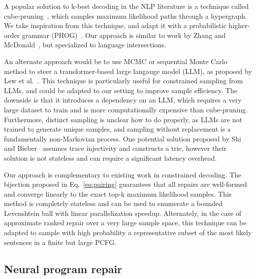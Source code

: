 \documentclass[sigplan,review,acmsmall,nonacm,anonymous]{acmart}\settopmatter{printfolios=false,printccs=false,printacmref=false}
\begin{document}
A popular solution to k-best decoding in the NLP literature is a technique called cube-pruning~\cite{huang2005better, huang2007forest, chiang2007hierarchical}, which samples maximum likelihood paths through a hypergraph. We take inspiration from this technique, and adapt it with a probabilistic higher-order grammar (PHOG)~\cite{bielik2016phog}. Our approach is similar to work by Zhang and McDonald~\cite{zhang2012generalized}, but specialized to language intersections.

  An alternate approach would be to use MCMC or sequential Monte Carlo method to steer a transformer-based large langauge model (LLM), as proposed by Lew et al.~\cite{lew2023sequential}. This technique is particularly useful for constrained sampling from LLMs, and could be adapted to our setting to improve sample efficiency. The downside is that it introduces a dependency on an LLM, which requires a very large dataset to train and is more computationally expensive than cube-pruning. Furthermore, distinct sampling is unclear how to do properly, as LLMs are not trained to generate unique samples, and sampling without replacement is a fundamentally non-Markovian process. One potential solution proposed by Shi and Bieber~\cite{shi2020incremental} assumes trace injectivity and constructs a trie, however their solution is not stateless and can require a significant latency overhead.

  Our approach is complementary to existing work in constrained decoding. The bijection proposed in Eq.~\ref{eq:pairing} guarantees that all repairs are well-formed and converge linearly to the exact top-k maximum likelihood samples. This method is completely stateless and can be used to enumerate a bounded Levenshtein ball with linear parallelization speedup. Alternately, in the case of approximate ranked repair over a very large sample space, this technique can be adapted to sample with high probability a representative subset of the most likely sentences in a finite but large PCFG.

  \subsection{Neural program repair}
\end{document}

